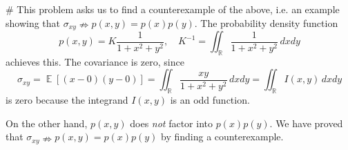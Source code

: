 \documentclass[12pt, a4paper]{article}
\newcommand{\R}{\mathbb{R}}
\DeclareMathOperator{\E}{\mathbb{E}}
\begin{document}
\begin{easylist}[enumerate]
# This problem asks us to find a counterexample of the above, i.e. an example showing that $\sigma_{xy} \nRightarrow p(x, y) = p(x) p(y)$.
The probability density function
\begin{equation*}
	p(x, y) = K \frac{1}{1 + x^2 + y^2}, \quad K^{-1} = \iint_{\R} \frac{1}{1 + x^2 + y^2} \, dx dy
\end{equation*}
achieves this.
The covariance is zero, since 
\begin{equation*}
	\sigma_{xy} = \E \left[ (x - 0) (y - 0)\right] = \iint_{\R} \frac{x y}{1 + x^2 + y^2} \, dx dy = \iint_{\R} I(x, y) \, dx dy
\end{equation*}
is zero because the integrand $I(x, y)$ is an odd function.

On the other hand, $p(x, y)$ does \emph{not} factor into $p(x) p(y)$.
We have proved that $\sigma_{xy} \nRightarrow p(x, y) = p(x) p(y)$ by finding a counterexample.
\end{easylist}
\end{document}
